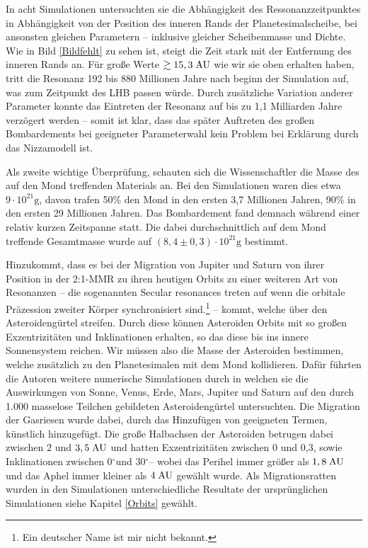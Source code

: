 \documentclass[10pt,a4paper,twoside]{article}
\newcommand{\refsec}[1]{siehe Kapitel \ref{#1}}
\newcommand{\degree}{$^\circ$}
\begin{document}
In acht Simulationen untersuchten sie die Abhängigkeit des Ressonanzzeitpunktes in Abhängigkeit von der Position des inneren Rands der Planetesimalscheibe, bei ansonsten gleichen Parametern – inklusive gleicher Scheibenmasse und Dichte. Wie in Bild \ref{Bildfehlt} zu sehen ist, steigt die Zeit stark mit der Entfernung des inneren Rands an. Für große Werte $\gtrsim 15,3 \;\mathrm{AU}$ wie wir sie oben erhalten haben, tritt die Resonanz 192 bis 880 Millionen Jahre nach beginn der Simulation auf, was zum Zeitpunkt des LHB passen würde.\cite{Gomes2005} %
Durch zusätzliche Variation anderer Parameter konnte das Eintreten der Resonanz auf bis zu 1,1 Milliarden Jahre\cite{Gomes2005} verzögert werden – somit ist klar, dass das später Auftreten des großen Bombardements bei geeigneter Parameterwahl kein Problem bei Erklärung durch das Nizzamodell ist.

Als zweite wichtige Überprüfung, schauten sich die Wissenschaftler die Masse des auf den Mond treffenden Materials an. Bei den Simulationen waren dies etwa $9 \cdot 10^{21} \mathrm{g}$, davon trafen 50\% den Mond in den ersten 3,7 Millionen Jahren, 90\% in den ersten 29 Millionen Jahren. Das Bombardement fand demnach während einer relativ kurzen Zeitspanne statt. Die dabei durchschnittlich auf dem Mond treffende Gesamtmasse wurde auf $\left(8,4 \pm 0,3\right) \cdot 10^{21} \mathrm{g}$ bestimmt\cite{Gomes2005}.

Hinzukommt, dass es bei der Migration von Jupiter und Saturn von ihrer Position in der 2:1-MMR zu ihren heutigen Orbits zu einer weiteren Art von Resonanzen – die sogenannten Secular resonances treten auf wenn die orbitale Präzession zweiter Körper synchronisiert sind.\footnote{Ein deutscher Name ist mir nicht bekannt.} – %
kommt, welche über den Asteroidengürtel streifen. %
Durch diese können Asteroiden Orbits mit so großen Exzentrizitäten und Inklinationen erhalten, so das diese bis ins innere Sonnensystem reichen. Wir müssen also die Masse der Asteroiden bestimmen, welche zusätzlich zu den Planetesimalen %
mit dem Mond kollidieren.
Dafür führten die Autoren weitere numerische Simulationen durch in welchen sie die Auswirkungen von Sonne, Venus, Erde, Mars, Jupiter und Saturn auf den durch 1.000 masselose Teilchen gebildeten Asteroidengürtel untersuchten.
Die Migration der Gasriesen wurde dabei, durch das Hinzufügen von geeigneten Termen, künstlich hinzugefügt. %
Die große Halbachsen der Asteroiden betrugen dabei zwischen $2$ und $3,5 \;\mathrm{AU}$ und hatten Exzentrizitäten zwischen 0 und 0,3, sowie Inklinationen zwischen 0\degree und 30\degree – wobei das Perihel immer größer als $1,8 \;\mathrm{AU}$ und das Aphel immer kleiner als $4 \;\mathrm{AU}$ gewählt wurde. %
Als Migrationsratten wurden in den Simulationen unterschiedliche Resultate der ursprünglichen Simulationen \refsec{Orbits} gewählt. %
\end{document}
